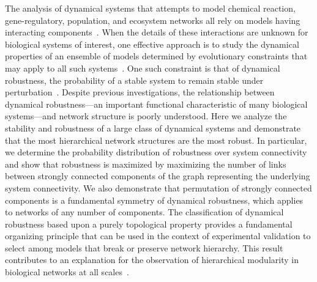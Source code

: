 The analysis of dynamical systems that attempts to model chemical reaction, gene-regulatory, population, and ecosystem networks all rely on models having interacting components~\cite{RossCr2003,Alon2006,Palsson2006,HamidBolouri2008,Palsson2011a,Voit2012,Sauro2012}. When the details of these interactions are unknown for biological systems of interest, one effective approach is to study the dynamical properties of an ensemble of models determined by evolutionary constraints that may apply to all such systems~\cite{Gardner1970,May1972,Cohen1984,May1972a,Radius2014}. One such constraint is that of dynamical robustness, the probability of a stable system to remain stable under perturbation~\cite{WADDINGTON1942a,Wagner1997,Rutherford1998,VanNimwegen1999,Siegal2002,Bergman2003,Ciliberti2007b,Ciliberti2007,Draghi2010,Wagner2013}. Despite previous investigations, the relationship between dynamical robustness---an important functional characteristic of many biological systems---and network structure is poorly understood. Here we analyze the stability and robustness of a large class of dynamical systems and demonstrate that the most hierarchical network structures are the most robust. In particular, we determine the probability distribution of robustness over system connectivity and show that robustness is maximized by maximizing the number of links between strongly connected components of the graph representing the underlying system connectivity. We also demonstrate that permutation of strongly connected components is a fundamental symmetry of dynamical robustness, which applies to networks of any number of components.  The classification of dynamical robustness based upon a purely topological property provides a fundamental organizing principle that can be used in the context of experimental validation to select among models that break or preserve network hierarchy. This result contributes to an explanation for the observation of hierarchical modularity in biological networks at all scales~\cite{Zhao2006,Ravasz2002,Bhardwaj2010,Colm,Corominas-Murtra2013}.
